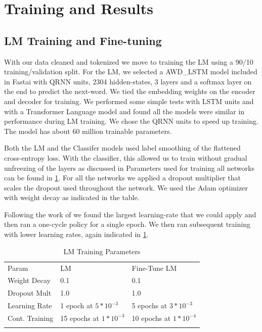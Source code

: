 \documentclass[smallcondensed]{svjour3}     %
\begin{document}
\section{Training and Results}
\label{sec:4}

\subsection{LM Training and Fine-tuning}
With our data cleaned and tokenized we move to training the LM using a 90/10 training/validation split.  For the LM, we selected a AWD\_LSTM \cite{} model included in Fastai with QRNN units, 2304 hidden-states, 3 layers and a softmax layer on the end to predict the next-word.  We tied the embedding weights on the encoder and decoder for training.  We performed some simple tests with LSTM units and with a Transformer Language model and found all the models were similar in performance during LM training.  We chose the QRNN units to speed up training. The model has about 60 million trainable parameters.  

Both the LM and the Classifer models used label smoothing \cite{labelsmooth} of the flattened cross-entropy loss.  With the classifier, this allowed us to train without gradual unfreezing of the layers as discussed in \cite{HowarRuder:DBLP:journals/corr/abs-1801-06146}
Parameters used for training all networks can be found in \ref{tab:tab_training}.
For all the networks we applied a dropout multiplier that scales the dropout used throughout the network.  We used the Adam optimizer with weight decay as indicated in the table.  

Following the work of \cite{smith}  we found the largest learning-rate that we could apply and then ran a one-cycle policy \cite{} for a single epoch. We then ran subsequent training with lower learning rates, again indicated in \ref{tab:tab_training}.

\begin{table}[ht]
	\caption{LM Training Parameters}
	\label{tab:tab_training}       %
\begin{tabular}{lll}
	\hline\noalign{\smallskip}
	Param & LM & Fine-Tune LM \\
	\noalign{\smallskip}\hline\noalign{\smallskip}
	Weight Decay & 0.1 & 0.1 \\
	Dropout Mult & 1.0 & 1.0 \\
	Learning Rate & 1 epoch at $5*10^{-3}$ & 5 epochs at $3*10^{-3}$ \\
    Cont. Training & 15 epochs at $1*10^{-3}$ & 10 epochs at $1*10^{-4}$\\
	\noalign{\smallskip}\hline
\end{tabular}
\end{table}
\end{document}
